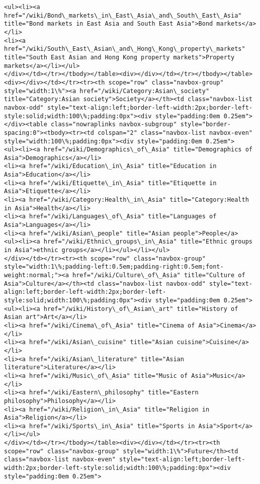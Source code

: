 \documentclass[11pt]{article}
\begin{document}
\begin{Verbatim}[commandchars=\\\{\}]
<ul><li><a href="/wiki/Bond\_markets\_in\_East\_Asia\_and\_South\_East\_Asia" title="Bond markets in East Asia and South East Asia">Bond markets</a></li>
<li><a href="/wiki/South\_East\_Asian\_and\_Hong\_Kong\_property\_markets" title="South East Asian and Hong Kong property markets">Property markets</a></li></ul>
</div></td></tr></tbody></table><div></div></td></tr></tbody></table><div></div></td></tr><tr><th scope="row" class="navbox-group" style="width:1\%"><a href="/wiki/Category:Asian\_society" title="Category:Asian society">Society</a></th><td class="navbox-list navbox-odd" style="text-align:left;border-left-width:2px;border-left-style:solid;width:100\%;padding:0px"><div style="padding:0em 0.25em"></div><table class="nowraplinks navbox-subgroup" style="border-spacing:0"><tbody><tr><td colspan="2" class="navbox-list navbox-even" style="width:100\%;padding:0px"><div style="padding:0em 0.25em">
<ul><li><a href="/wiki/Demographics\_of\_Asia" title="Demographics of Asia">Demographics</a></li>
<li><a href="/wiki/Education\_in\_Asia" title="Education in Asia">Education</a></li>
<li><a href="/wiki/Etiquette\_in\_Asia" title="Etiquette in Asia">Etiquette</a></li>
<li><a href="/wiki/Category:Health\_in\_Asia" title="Category:Health in Asia">Health</a></li>
<li><a href="/wiki/Languages\_of\_Asia" title="Languages of Asia">Languages</a></li>
<li><a href="/wiki/Asian\_people" title="Asian people">People</a>
<ul><li><a href="/wiki/Ethnic\_groups\_in\_Asia" title="Ethnic groups in Asia">ethnic groups</a></li></ul></li></ul>
</div></td></tr><tr><th scope="row" class="navbox-group" style="width:1\%;padding-left:0.5em;padding-right:0.5em;font-weight:normal;"><a href="/wiki/Culture\_of\_Asia" title="Culture of Asia">Culture</a></th><td class="navbox-list navbox-odd" style="text-align:left;border-left-width:2px;border-left-style:solid;width:100\%;padding:0px"><div style="padding:0em 0.25em">
<ul><li><a href="/wiki/History\_of\_Asian\_art" title="History of Asian art">Art</a></li>
<li><a href="/wiki/Cinema\_of\_Asia" title="Cinema of Asia">Cinema</a></li>
<li><a href="/wiki/Asian\_cuisine" title="Asian cuisine">Cuisine</a></li>
<li><a href="/wiki/Asian\_literature" title="Asian literature">Literature</a></li>
<li><a href="/wiki/Music\_of\_Asia" title="Music of Asia">Music</a></li>
<li><a href="/wiki/Eastern\_philosophy" title="Eastern philosophy">Philosophy</a></li>
<li><a href="/wiki/Religion\_in\_Asia" title="Religion in Asia">Religion</a></li>
<li><a href="/wiki/Sports\_in\_Asia" title="Sports in Asia">Sport</a></li></ul>
</div></td></tr></tbody></table><div></div></td></tr><tr><th scope="row" class="navbox-group" style="width:1\%">Future</th><td class="navbox-list navbox-even" style="text-align:left;border-left-width:2px;border-left-style:solid;width:100\%;padding:0px"><div style="padding:0em 0.25em">

\end{Verbatim}
\end{document}
